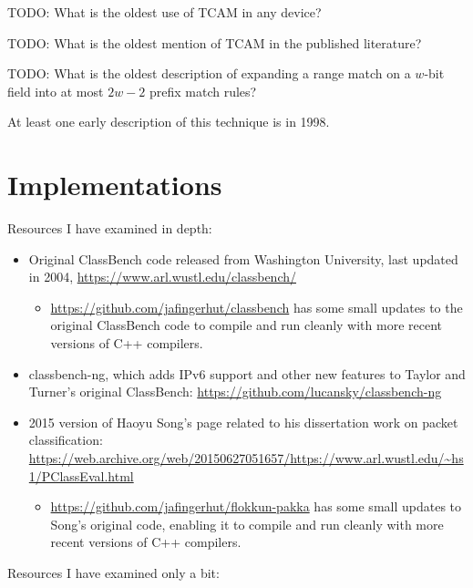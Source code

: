\documentclass[acmsmall]{acmart}
\newcommand{\todo}[1]{}
\renewcommand{\todo}[1]{{\color{red} TODO: {#1}}}
\begin{document}
\todo{What is the oldest use of TCAM in any device?}

\todo{What is the oldest mention of TCAM in the published literature?}

\todo{What is the oldest description of expanding a range match on a
  $w$-bit field into at most $2w-2$ prefix match rules?}

At least one early description of this technique is in
1998\cite[Sec. 4]{SVSW1998}.


\section{Implementations}

Resources I have examined in depth:

\begin{itemize}
\item Original ClassBench code released from Washington University,
  last updated in 2004, \url{https://www.arl.wustl.edu/classbench/}
  \begin{itemize}
  \item \url{https://github.com/jafingerhut/classbench} has some
    small updates to the original ClassBench code to compile and
    run cleanly with more recent versions of C++ compilers.
  \end{itemize}
\item classbench-ng, which adds IPv6 support and other new features
  to Taylor and Turner's original ClassBench:
  \url{https://github.com/lucansky/classbench-ng}
\item 2015 version of Haoyu Song's page
  related to his dissertation work on packet classification:
  \url{https://web.archive.org/web/20150627051657/https://www.arl.wustl.edu/~hs1/PClassEval.html}
  \begin{itemize}
  \item \url{https://github.com/jafingerhut/flokkun-pakka} has some
    small updates to Song's original code, enabling it to compile and
    run cleanly with more recent versions of C++ compilers.
  \end{itemize}
\end{itemize}

Resources I have examined only a bit:
\end{document}
